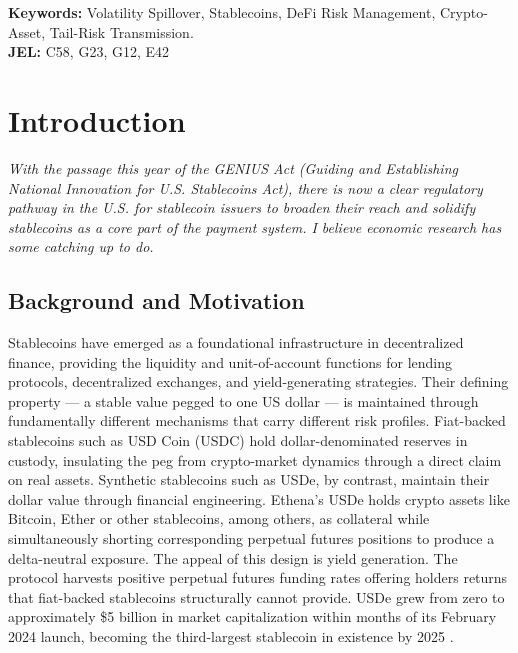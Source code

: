 \documentclass[12pt,a4paper,titlepage,oneside,english]{article}
\begin{document}
\vfill
\textbf{Keywords:} Volatility Spillover, Stablecoins, DeFi Risk Management, Crypto-Asset, Tail-Risk Transmission.\\
\noindent\textbf{JEL:} C58, G23, G12, E42




\newpage
{}
\tableofcontents
\vspace{1.5cm}
\begin{center}
\end{center}
\singlespacing


\newpage
\onehalfspacing
{}



 \section{Introduction}
\textit{With the passage this year of the GENIUS Act (Guiding and Establishing National Innovation for U.S.
Stablecoins Act), there is now a clear regulatory pathway in the U.S. for stablecoin issuers to broaden their reach and solidify stablecoins as a core part of the payment system. I believe economic research has some catching up to do.} \parencite{Miran_Stablecoin}\\
\subsection{Background and Motivation}
Stablecoins have emerged as a foundational infrastructure in decentralized finance, providing
the liquidity and unit-of-account functions for lending protocols, decentralized
exchanges, and yield-generating strategies. Their defining property — a stable value
pegged to one US dollar — is maintained through fundamentally different mechanisms that
carry different risk profiles. Fiat-backed stablecoins such as USD Coin (USDC)
hold dollar-denominated reserves in custody, insulating the peg from
crypto-market dynamics through a direct claim on real assets. Synthetic stablecoins such as USDe,
by contrast, maintain their dollar value through financial engineering. Ethena's USDe holds
crypto assets like Bitcoin, Ether or other stablecoins, among others, as collateral while simultaneously shorting corresponding perpetual futures positions to produce a delta-neutral exposure. The appeal of this design is yield
generation. The protocol harvests positive perpetual futures funding rates offering holders returns that fiat-backed stablecoins structurally cannot provide.
USDe grew from zero to approximately \$5 billion in market capitalization within months of
its February 2024 launch, becoming the third-largest stablecoin in existence by 2025 \parencite{ethena_transparency}.\\
\end{document}
